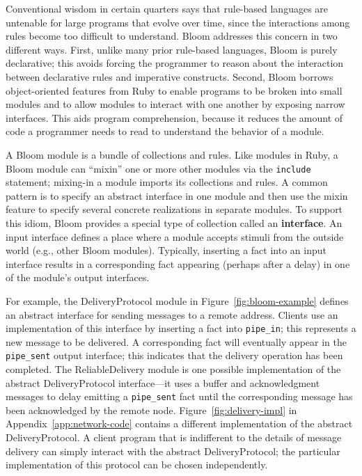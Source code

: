 \begin{comment}
Conventional wisdom in certain quarters says that rule-based languages are
untenable for large programs that evolve over time, since the interactions among
rules become too difficult to understand.  We believe this concern is an
artifact of early rule languages that mixed apparently declarative syntax with
imperative constructs and assumptions, and which had little support for
modularity and reuse of code.
\end{comment}

Conventional wisdom in certain quarters says that rule-based languages are
untenable for large programs that evolve over time, since the interactions among
rules become too difficult to understand.  Bloom addresses this concern in two
different ways. First, unlike many prior rule-based languages, Bloom is purely
declarative; this avoids forcing the programmer to reason about the interaction
between declarative rules and imperative constructs. Second, Bloom borrows
object-oriented features from Ruby to enable programs to be broken into small
modules and to allow modules to interact with one another by exposing narrow
interfaces. This aids program comprehension, because it reduces the amount of
code a programmer needs to read to understand the behavior of a module.

A Bloom module is a bundle of collections and rules. Like modules in Ruby, a
Bloom module can ``mixin'' one or more other modules via the \texttt{include}
statement; mixing-in a module imports its collections and rules. A common
pattern is to specify an abstract interface in one module and then use the
mixin feature to specify several concrete realizations in separate modules. To
support this idiom, Bloom provides a special type of collection called an
\textbf{interface}. An input interface defines a place where a module accepts
stimuli from the outside world (e.g., other Bloom modules). Typically, inserting
a fact into an input interface results in a corresponding fact appearing
(perhaps after a delay) in one of the module's output interfaces.

For example, the DeliveryProtocol module in Figure~\ref{fig:bloom-example}
defines an abstract interface for sending messages to a remote address. Clients
use an implementation of this interface by inserting a fact into
\texttt{pipe\_in}; this represents a new message to be delivered. A
corresponding fact will eventually appear in the \texttt{pipe\_sent} output
interface; this indicates that the delivery operation has been completed. The
ReliableDelivery module is one possible implementation of the abstract
DeliveryProtocol interface---it uses a buffer and acknowledgment messages to
delay emitting a \texttt{pipe\_sent} fact until the corresponding message has
been acknowledged by the remote node. Figure~\ref{fig:delivery-impl} in
Appendix~\ref{app:network-code} contains a different implementation of the
abstract DeliveryProtocol. A client program that is indifferent to the details
of message delivery can simply interact with the abstract DeliveryProtocol; the
particular implementation of this protocol can be chosen independently.

